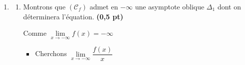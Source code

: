 \documentclass[12pt,a4paper]{article}
\begin{document}
\begin{enumerate}
\begin{itemize}
$
\begin{aligned}
\begin{cases}
x^2+x = 0\\
x = 0 
\end{cases}\implies
\begin{cases}
x=0 \textbf{ ou } x=-1\\
x = 0
\end{cases}
\end{aligned}
$


$$ S = \emptyset $$ Ainsi, il n'existe pas de $ x > 0 $ pour lequel $ x-\sqrt{x^2+x} > 0  $

 $$ \textbf{Donc } x-\sqrt{x^2+x} <0,  \, \forall x\in ]0;+\infty[ $$

\textcolor{red}{Ainsi  $\forall x\in ]0;+\infty[$ $f'(x) > 0 $ donc f  est croissant $0;+\infty[$}

\(
\begin{aligned}
\lim\limits_{x \to 0^+} \dfrac{f(x)-f(0)}{x} &=\lim\limits_{x \to 0^+} \dfrac{-1}{(x - \sqrt{x^2+x})}\\
															               &=\dfrac{-1}{0^-}\\
															               &=+\infty \\
\end{aligned}    
\)

\textcolor{red}{ $f$ n'est pas dérivable à droite de $0$ donc admet une démi-tangent orientée vers le haut en $0^+$  }

\end{itemize}     
    
    \item 
      \begin{enumerate}
        \item Montrons que $(\mathcal{C}_f)$ admet en $-\infty$ une asymptote oblique $\Delta_1$ dont on déterminera l’équation. \textbf{(0,5 pt)}

Comme $\lim\limits_{x \to -\infty} f(x) = -\infty$  

\begin{itemize}
\item Cherchons  $\lim\limits_{x \to -\infty} \dfrac{f(x)}{x} $  


\end{itemize}
\end{enumerate}
\end{enumerate}
\end{document}
